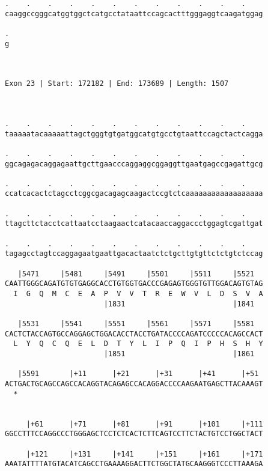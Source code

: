 \documentclass{article}
\begin{document}
\begin{Verbatim}
.    .    .    .    .    .    .    .    .    .    .    .    
caaggccgggcatggtggctcatgcctataattccagcactttgggaggtcaagatggag
                                                            
.
g
 
 
 
Exon 23 | Start: 172182 | End: 173689 | Length: 1507



.    .    .    .    .    .    .    .    .    .    .    .    
taaaaatacaaaaattagctgggtgtgatggcatgtgcctgtaattccagctactcagga
                                                            
.    .    .    .    .    .    .    .    .    .    .    .    
ggcagagacaggagaattgcttgaacccaggaggcggaggttgaatgagccgagattgcg
                                                            
.    .    .    .    .    .    .    .    .    .    .    .    
ccatcacactctagcctcggcgacagagcaagactccgtctcaaaaaaaaaaaaaaaaaa
                                                            
.    .    .    .    .    .    .    .    .    .    .    .    
ttagcttctacctcattaatcctaagaactcatacaaccaggaccctggagtcgattgat
                                                            
.    .    .    .    .    .    .    .    .    .    .    .    
tagagcctagtccaggagaatgaattgacactaatctctgcttgtgttctctgtctccag
                                                            
   |5471     |5481     |5491     |5501     |5511     |5521  
CAATTGGGCAGATGTGTGAGGCACCTGTGGTGACCCGAGAGTGGGTGTTGGACAGTGTAG
  I  G  Q  M  C  E  A  P  V  V  T  R  E  W  V  L  D  S  V  A
                       |1831                         |1841  
  
   |5531     |5541     |5551     |5561     |5571     |5581  
CACTCTACCAGTGCCAGGAGCTGGACACCTACCTGATACCCCAGATCCCCCACAGCCACT
  L  Y  Q  C  Q  E  L  D  T  Y  L  I  P  Q  I  P  H  S  H  Y
                       |1851                         |1861  
  
   |5591       |+11      |+21      |+31      |+41      |+51 
ACTGACTGCAGCCAGCCACAGGTACAGAGCCACAGGACCCCAAGAATGAGCTTACAAAGT
  *   
                                                            
  
     |+61      |+71      |+81      |+91      |+101     |+111
GGCCTTTCCAGGCCCTGGGAGCTCCTCTCACTCTTCAGTCCTTCTACTGTCCTGGCTACT
                                                            
     |+121     |+131     |+141     |+151     |+161     |+171
AAATATTTTATGTACATCAGCCTGAAAAGGACTTCTGGCTATGCAAGGGTCCCTTAAAGA
                                                            

\end{Verbatim}
\end{document}
